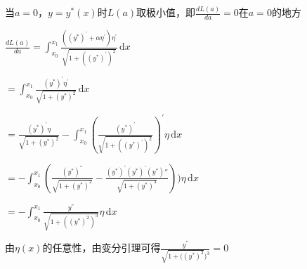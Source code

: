 \documentclass{article}
\begin{document}
当$a=0$，$y=y^{*}(x)$时$L(a)$取极小值，即$\frac{dL(a)}{da}=0$在$a=0$的地方

$\frac{dL(a)}{da}=\int_{x_{0}}^{x_{1}}\frac{((y^{*})^{'}+\alpha\eta^{'})\eta^{'}}{\sqrt{1+((y^{*})^{'})^2}}\,\mathrm{d}x$

$=\int_{x_{0}}^{x_{1}}\frac{(y^{*})^{'}\eta^{'}}{\sqrt{1+(y^{*})^2}}\,\mathrm{d}x$ 

$=\frac{(y^{*})^{'}\eta}{\sqrt{1+(y^{*})^2}}-\int_{x_{0}}^{x_{1}}(\frac{(y^{*})^{'}}{\sqrt{1+((y^{*})^{'})^2}})^{'}\eta\,\mathrm{d}x$

$=-\int_{x_{0}}^{x_{1}}(\frac{(y^{*})^{''}}{\sqrt{1+(y^{*})^2}}-\frac{(y^{*})^{'} (y^{*})^{'}(y^{*}){''}}{\sqrt{1+(y^{*})^3}}))\eta\,\mathrm{d}x$

$=-\int_{x_{0}}^{x_{1}}\frac{y^{''}}{\sqrt{1+((y^{*})^{2})^3}}\eta\,\mathrm{d}x$

由$\eta(x)$的任意性，由变分引理可得$\frac{y^{''}}{\sqrt{1+((y^{*})^{2}})^{3}}=0$


\nocite{*}
%
\end{document}
